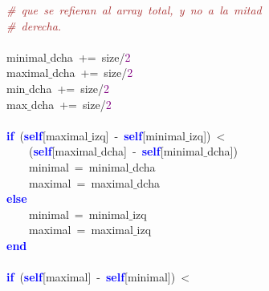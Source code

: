 \mbox{}\ \ \ \ \ \ \ \ \textit{\textcolor{Brown}{\#\ que\ se\ refieran\ al\ array\ total,\ y\ no\ a\ la\ mitad\ }} \\
\mbox{}\ \ \ \ \ \ \ \ \textit{\textcolor{Brown}{\#\ derecha.\ }} \\
\mbox{} \\
\mbox{}\ \ \ \ \ \ \ \ minimal$\_$dcha\ \textcolor{BrickRed}{+=}\ size\textcolor{BrickRed}{/}\textcolor{Purple}{2} \\
\mbox{}\ \ \ \ \ \ \ \ maximal$\_$dcha\ \textcolor{BrickRed}{+=}\ size\textcolor{BrickRed}{/}\textcolor{Purple}{2} \\
\mbox{}\ \ \ \ \ \ \ \ min$\_$dcha\ \textcolor{BrickRed}{+=}\ size\textcolor{BrickRed}{/}\textcolor{Purple}{2} \\
\mbox{}\ \ \ \ \ \ \ \ max$\_$dcha\ \textcolor{BrickRed}{+=}\ size\textcolor{BrickRed}{/}\textcolor{Purple}{2} \\
\mbox{} \\
\mbox{}\ \ \ \ \ \ \ \ \textbf{\textcolor{Blue}{if}}\ \textcolor{BrickRed}{(}\textbf{\textcolor{Blue}{self}}\textcolor{BrickRed}{[}maximal$\_$izq\textcolor{BrickRed}{]}\ \textcolor{BrickRed}{-}\ \textbf{\textcolor{Blue}{self}}\textcolor{BrickRed}{[}minimal$\_$izq\textcolor{BrickRed}{])}\ \textcolor{BrickRed}{\textless{}}\  \\
\mbox{}\ \ \ \ \ \ \ \ \ \ \ \ \textcolor{BrickRed}{(}\textbf{\textcolor{Blue}{self}}\textcolor{BrickRed}{[}maximal$\_$dcha\textcolor{BrickRed}{]}\ \textcolor{BrickRed}{-}\ \textbf{\textcolor{Blue}{self}}\textcolor{BrickRed}{[}minimal$\_$dcha\textcolor{BrickRed}{])} \\
\mbox{}\ \ \ \ \ \ \ \ \ \ \ \ minimal\ \textcolor{BrickRed}{=}\ minimal$\_$dcha \\
\mbox{}\ \ \ \ \ \ \ \ \ \ \ \ maximal\ \textcolor{BrickRed}{=}\ maximal$\_$dcha \\
\mbox{}\ \ \ \ \ \ \ \ \textbf{\textcolor{Blue}{else}}\  \\
\mbox{}\ \ \ \ \ \ \ \ \ \ \ \ minimal\ \textcolor{BrickRed}{=}\ minimal$\_$izq \\
\mbox{}\ \ \ \ \ \ \ \ \ \ \ \ maximal\ \textcolor{BrickRed}{=}\ maximal$\_$izq \\
\mbox{}\ \ \ \ \ \ \ \ \textbf{\textcolor{Blue}{end}}\  \\
\mbox{} \\
\mbox{}\ \ \ \ \ \ \ \ \textbf{\textcolor{Blue}{if}}\ \textcolor{BrickRed}{(}\textbf{\textcolor{Blue}{self}}\textcolor{BrickRed}{[}maximal\textcolor{BrickRed}{]}\ \textcolor{BrickRed}{-}\ \textbf{\textcolor{Blue}{self}}\textcolor{BrickRed}{[}minimal\textcolor{BrickRed}{])}\ \textcolor{BrickRed}{\textless{}}\  \\
